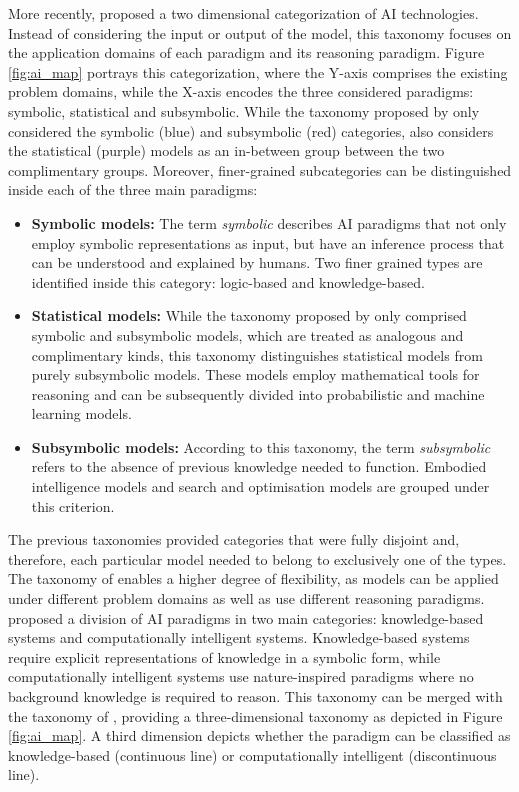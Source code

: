 More recently, \cite{corea_ai_2019} proposed a two dimensional categorization of AI technologies. Instead of considering the input or output of the model, this taxonomy focuses on the application domains of each paradigm and its reasoning paradigm. Figure \ref{fig:ai_map} portrays this categorization, where the Y-axis comprises the existing problem domains, while the X-axis encodes the three considered paradigms: symbolic, statistical and subsymbolic. While the taxonomy proposed by \cite{lieberman_symbolic_nodate} only considered the symbolic (blue) and subsymbolic (red) categories, \cite{corea_ai_2019} also considers the statistical (purple) models as an in-between group between the two complimentary groups. Moreover, finer-grained subcategories can be distinguished inside each of the three main paradigms:
\begin{itemize}
    \item \textbf{Symbolic models:} The term \textit{symbolic} describes AI paradigms that not only employ symbolic representations as input, but have an inference process that can be understood and explained by humans. Two finer grained types are identified inside this category: logic-based and knowledge-based.
    \item \textbf{Statistical models:} While the taxonomy proposed by \cite{lieberman_symbolic_nodate} only comprised symbolic and subsymbolic models, which are treated as analogous and complimentary kinds, this taxonomy distinguishes statistical models from purely subsymbolic models. These models employ mathematical tools for reasoning and can be subsequently divided into probabilistic and machine learning models.
    \item\textbf{Subsymbolic models:} According to this taxonomy, the term \textit{subsymbolic} refers to the absence of previous knowledge needed to function. Embodied intelligence models and search and optimisation models are grouped under this criterion.
\end{itemize}

The previous taxonomies provided categories that were fully disjoint and, therefore, each particular model needed to belong to exclusively one of the types. The taxonomy of \cite{corea_ai_2019} enables a higher degree of flexibility, as models can be applied under different problem domains as well as use different reasoning paradigms.
\cite{hopgood_2009_knowledge-based} proposed a division of AI paradigms in two main categories: knowledge-based systems and computationally intelligent systems. Knowledge-based systems require explicit representations of knowledge in a symbolic form, while computationally intelligent systems use nature-inspired paradigms where no background knowledge is required to reason. This taxonomy can be merged with the taxonomy of \cite{corea_ai_2019}, providing a three-dimensional taxonomy as depicted in Figure \ref{fig:ai_map}. A third dimension depicts whether the paradigm can be classified as knowledge-based (continuous line) or computationally intelligent (discontinuous line). 


